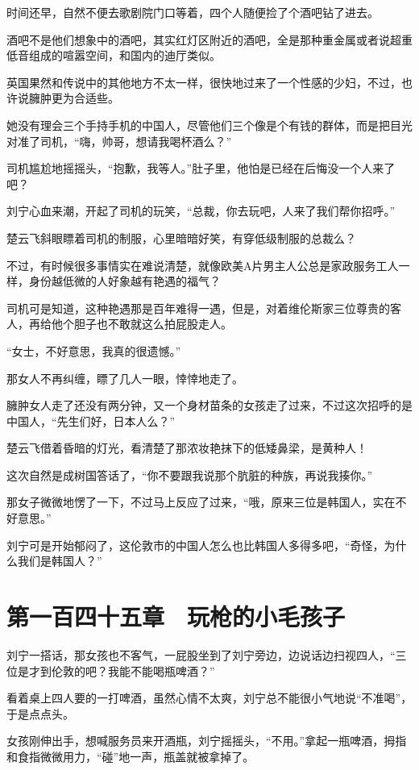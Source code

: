 时间还早，自然不便去歌剧院门口等着，四个人随便捡了个酒吧钻了进去。

酒吧不是他们想象中的酒吧，其实红灯区附近的酒吧，全是那种重金属或者说超重低音组成的喧嚣空间，和国内的迪厅类似。

英国果然和传说中的其他地方不太一样，很快地过来了一个性感的少妇，不过，也许说臃肿更为合适些。

她没有理会三个手持手机的中国人，尽管他们三个像是个有钱的群体，而是把目光对准了司机，“嗨，帅哥，想请我喝杯酒么？”

司机尴尬地摇摇头，“抱歉，我等人。”肚子里，他怕是已经在后悔没一个人来了吧？

刘宁心血来潮，开起了司机的玩笑，“总裁，你去玩吧，人来了我们帮你招呼。”

楚云飞斜眼瞟着司机的制服，心里暗暗好笑，有穿低级制服的总裁么？

不过，有时候很多事情实在难说清楚，就像欧美A片男主人公总是家政服务工人一样，身份越低微的人好象越有艳遇的福气？

司机可是知道，这种艳遇那是百年难得一遇，但是，对着维伦斯家三位尊贵的客人，再给他个胆子也不敢就这么拍屁股走人。

“女士，不好意思，我真的很遗憾。”

那女人不再纠缠，瞟了几人一眼，悻悻地走了。

臃肿女人走了还没有两分钟，又一个身材苗条的女孩走了过来，不过这次招呼的是中国人，“先生们好，日本人么？”

楚云飞借着昏暗的灯光，看清楚了那浓妆艳抹下的低矮鼻梁，是黄种人！

这次自然是成树国答话了，“你不要跟我说那个肮脏的种族，再说我揍你。”

那女子微微地愣了一下，不过马上反应了过来，“哦，原来三位是韩国人，实在不好意思。”

刘宁可是开始郁闷了，这伦敦市的中国人怎么也比韩国人多得多吧，“奇怪，为什么我们是韩国人？”

\section{第一百四十五章　玩枪的小毛孩子}

刘宁一搭话，那女孩也不客气，一屁股坐到了刘宁旁边，边说话边扫视四人，“三位是才到伦敦的吧？我能不能喝瓶啤酒？”

看着桌上四人要的一打啤酒，虽然心情不太爽，刘宁总不能很小气地说“不准喝”，于是点点头。

女孩刚伸出手，想喊服务员来开酒瓶，刘宁摇摇头，“不用。”拿起一瓶啤酒，拇指和食指微微用力，“碰”地一声，瓶盖就被拿掉了。

